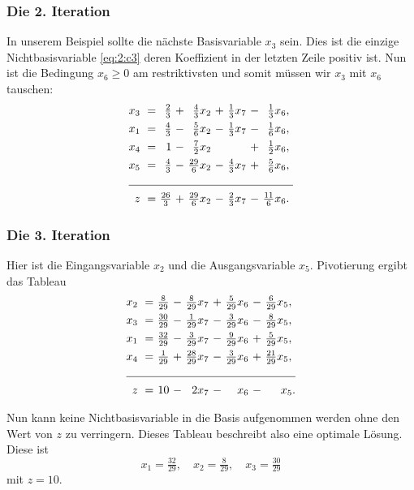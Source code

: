 \documentclass[smaller]{beamer}
\begin{document}
\begin{frame}
 \frametitle{Die 2. Iteration}
 In unserem Beispiel sollte die nächste Basisvariable $x_3$ sein. Dies ist die einzige Nichtbasisvariable \eqref{eq:2:c3} deren Koeffizient in der letzten Zeile positiv ist. Nun ist die Bedingung $x_6 \ge 0$ am restriktivsten und somit müssen wir $x_3$ mit $x_6$ tauschen:
\begin{align}
\begin{alignedat}{5}
\label{eq:2:c4}
x_3 &\ = &\ \tfrac{ 2}{3} &\ + &\ \tfrac{ 4}{3}x_2 &\ + &\ \tfrac{1}{3}x_7 &\ - &\ \tfrac{ 1}{3}x_6,\ \\
x_1 &\ = &\ \tfrac{ 4}{3} &\ - &\ \tfrac{ 5}{6}x_2 &\ - &\ \tfrac{1}{3}x_7 &\ - &\ \tfrac{ 1}{6}x_6,\ \\
x_4 &\ = &\            1 &\ - &\ \tfrac{ 7}{2}x_2 &\   &\                &\ + &\ \tfrac{ 1}{2}x_6,\ \\
x_5 &\ = &\ \tfrac{ 4}{3} &\ - &\ \tfrac{29}{6}x_2 &\ - &\ \tfrac{4}{3}x_7 &\ + &\ \tfrac{ 5}{6}x_6,\ \\ \cline{1-9}
  z &\ = &\ \tfrac{26}{3} &\ + &\ \tfrac{29}{6}x_2 &\ - &\ \tfrac{2}{3}x_7 &\ - &\ \tfrac{11}{6}x_6.\
\end{alignedat}
\end{align}
\end{frame}

\begin{frame}
 \frametitle{Die 3. Iteration}
 Hier ist die Eingangsvariable $x_2$ und die Ausgangsvariable $x_5$. Pivotierung ergibt das Tableau
\begin{align}
\begin{alignedat}{5}
\label{eq:2:c5}
x_2 &\ = &\ \tfrac{ 8}{29} &\ - &\ \tfrac{ 8}{29}x_7 &\ + &\ \tfrac{5}{29}x_6 &\ - &\ \tfrac{ 6}{29}x_5,\ \\
x_3 &\ = &\ \tfrac{30}{29} &\ - &\ \tfrac{ 1}{29}x_7 &\ - &\ \tfrac{3}{29}x_6 &\ - &\ \tfrac{ 8}{29}x_5,\ \\
x_1 &\ = &\ \tfrac{32}{29} &\ - &\ \tfrac{ 3}{29}x_7 &\ - &\ \tfrac{9}{29}x_6 &\ + &\ \tfrac{ 5}{29}x_5,\ \\
x_4 &\ = &\ \tfrac{ 1}{29} &\ + &\ \tfrac{28}{29}x_7 &\ - &\ \tfrac{3}{29}x_6 &\ + &\ \tfrac{21}{29}x_5,\ \\ \cline{1-9}
  z &\ = &\            10 &\ - &\             2x_7 &\ - &\             x_6 &\ - &\              x_5.
\end{alignedat}
\end{align}

Nun kann keine Nichtbasisvariable in die Basis aufgenommen werden ohne den Wert von $z$ zu verringern. Dieses Tableau beschreibt also eine optimale Lösung. Diese ist
\[
x_1 = \tfrac{32}{29}, \quad
x_2 = \tfrac{8}{29}, \quad
x_3 = \tfrac{30}{29}
\]
mit $z = 10$.
\end{frame}
\end{document}
